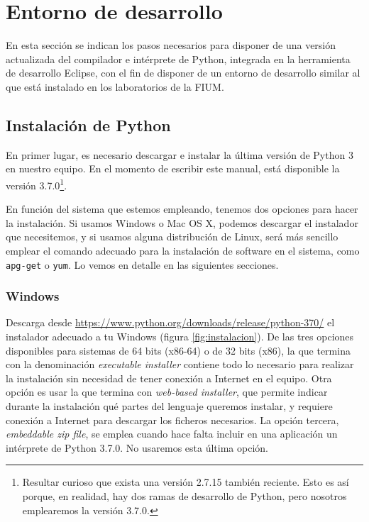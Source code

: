 \section{Entorno de desarrollo}

En esta sección se indican los pasos necesarios para disponer de una versión actualizada del compilador e intérprete de Python, integrada en la herramienta de desarrollo Eclipse, con el fin de disponer de un entorno de desarrollo similar al que está instalado en los laboratorios de la FIUM.

\subsection{Instalación de Python}\label{sec:instalacion}

En primer lugar, es necesario descargar e instalar la última versión de Python 3 en nuestro equipo. En el momento de escribir este manual, está disponible la versión 3.7.0\footnote{Resultar curioso que exista una versión 2.7.15 también reciente. Esto es así porque, en realidad, hay dos ramas de desarrollo de Python, pero nosotros emplearemos la versión 3.7.0.}.

En función del sistema que estemos empleando, tenemos dos opciones para hacer la instalación. Si usamos Windows o Mac OS X, podemos descargar el instalador que necesitemos, y si usamos alguna distribución de Linux, será más sencillo emplear el comando adecuado para la instalación de software en el sistema, como \texttt{apg-get} o \texttt{yum}. Lo vemos en detalle en las siguientes secciones.

\subsubsection{Windows}

Descarga desde \url{https://www.python.org/downloads/release/python-370/} el instalador adecuado a tu Windows (figura \ref{fig:instalacion}). De las tres opciones disponibles para sistemas de 64 bits (x86-64) o de 32 bits (x86), la que termina con la denominación \emph{executable installer} contiene todo lo necesario para realizar la instalación sin necesidad de tener conexión a Internet en el equipo. Otra opción es usar la que termina con \emph{web-based installer}, que permite indicar durante la instalación qué partes del lenguaje queremos instalar, y requiere conexión a Internet para descargar los ficheros necesarios. La opción tercera, \emph{embeddable zip file}, se emplea cuando hace falta incluir en una aplicación un intérprete de Python 3.7.0. No usaremos esta última opción.

